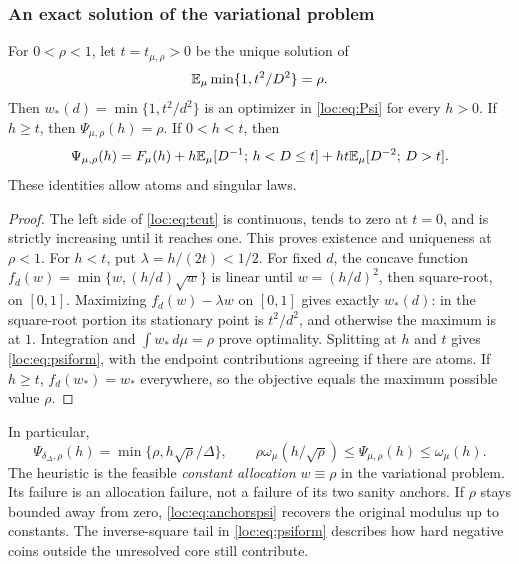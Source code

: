 \subsubsection{An exact solution of the variational problem}
\begin{proposition}\label{loc:prop:optimizer}
For $0<\rho<1$, let $t=t_{\mu,\rho}>0$ be the unique solution of
\begin{equation}\label{loc:eq:tcut}
 \mathbb E_\mu\min\{1,t^2/D^2\}=\rho.
\end{equation}
Then $w_*(d)=\min\{1,t^2/d^2\}$ is an optimizer in \eqref{loc:eq:Psi} for every $h>0$. If $h\ge t$, then $\Psi_{\mu,\rho}(h)=\rho$. If $0<h<t$, then
\begin{equation}\label{loc:eq:psiform}
 \Psi_{\mu,\rho}(h)=F_\mu(h)
 +h\mathbb E_\mu[D^{-1};\,h<D\le t]
 +ht\mathbb E_\mu[D^{-2};\,D>t].
\end{equation}
These identities allow atoms and singular laws.
\end{proposition}
\begin{proof}
The left side of \eqref{loc:eq:tcut} is continuous, tends to zero at $t=0$, and is strictly increasing until it reaches one. This proves existence and uniqueness at $\rho<1$.
For $h<t$, put $\lambda=h/(2t)<1/2$. For fixed $d$, the concave function
$f_d(w)=\min\{w,(h/d)\sqrt w\}$ is linear until $w=(h/d)^2$, then square-root, on $[0,1]$. Maximizing $f_d(w)-\lambda w$ on $[0,1]$ gives exactly $w_*(d)$: in the square-root portion its stationary point is $t^2/d^2$, and otherwise the maximum is at $1$. Integration and $\int w_*\,d\mu=\rho$ prove optimality. Splitting at $h$ and $t$ gives \eqref{loc:eq:psiform}, with the endpoint contributions agreeing if there are atoms. If $h\ge t$, $f_d(w_*)=w_*$ everywhere, so the objective equals the maximum possible value $\rho$.
\end{proof}

In particular,
\begin{equation}\label{loc:eq:anchorspsi}
 \Psi_{\delta_\Delta,\rho}(h)=\min\{\rho,h\sqrt\rho/\Delta\},\qquad
 \rho\omega_\mu(h/\sqrt\rho)\le\Psi_{\mu,\rho}(h)\le\omega_\mu(h).
\end{equation}
The heuristic is the feasible \emph{constant allocation} $w\equiv\rho$ in the variational problem. Its failure is an allocation failure, not a failure of its two sanity anchors. If $\rho$ stays bounded away from zero, \eqref{loc:eq:anchorspsi} recovers the original modulus up to constants. The inverse-square tail in \eqref{loc:eq:psiform} describes how hard negative coins outside the unresolved core still contribute.

